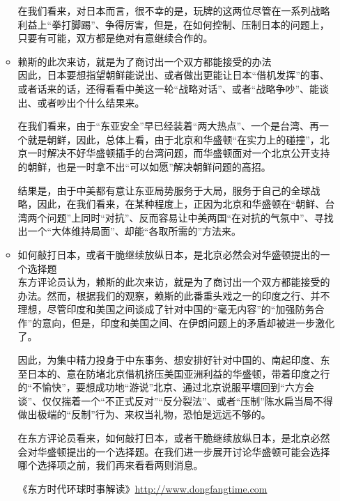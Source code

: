 \documentclass[a4paper,11pt]{article}
\begin{document}
\begin{itemize}
\begin{itemize}
    在我们看来，对日本而言，很不幸的是，玩牌的这两位尽管在一系列战略利益上“拳打脚踢”、争得厉害，但是，在如何控制、压制日本的问题上，只要有可能，双方都是绝对有意继续合作的。
 

\item 赖斯的此次来访，就是为了商讨出一个双方都能接受的办法\\
\label{sec-4_3_6}%
因此，日本要想指望朝鲜能说出、或者做出更能让日本“借机发挥”的事、或者话来的话，还得看看中美这一轮“战略对话”、或者“战略争吵”、能谈出、或者吵出个什么结果来。

   在我们看来，由于“东亚安全”早已经装着“两大热点”、一个是台湾、再一个就是朝鲜，因此，总体上看，由于北京和华盛顿“在实力上的碰撞”，北京一时解决不好华盛顿插手的台湾问题，而华盛顿面对一个北京公开支持的朝鲜，也是一时拿不出“可以如愿”解决朝鲜问题的高招。

    结果是，由于中美都有意让东亚局势服务于大局，服务于自己的全球战略，因此，在我们看来，在某种程度上，正因为北京和华盛顿在“朝鲜、台湾两个问题”上同时“对抗”、反而容易让中美两国“在对抗的气氛中”、寻找出一个“大体维持局面”、却能“各取所需的”方法来。
 

\item 如何敲打日本，或者干脆继续放纵日本，是北京必然会对华盛顿提出的一个选择题\\
\label{sec-4_3_7}%
东方评论员认为，赖斯的此次来访，就是为了商讨出一个双方都能接受的办法。然而，根据我们的观察，赖斯的此番重头戏之一的印度之行、并不理想，尽管印度和美国之间谈成了针对中国的“毫无内容”的“加强防务合作”的意向，但是，印度和美国之间、在伊朗问题上的矛盾却被进一步激化了。

   因此，为集中精力投身于中东事务、想安排好针对中国的、南起印度、东至日本的、意在防堵北京借机挤压美国亚洲利益的华盛顿，带着印度之行的“不愉快”，要想成功地“游说”北京、通过北京说服平壤回到“六方会谈”、仅仅揣着一个“不正式反对”“反分裂法”、或者“压制”陈水扁当局不得做出极端的“反制”行为、来权当礼物，恐怕是远远不够的。

   在东方评论员看来，如何敲打日本，或者干脆继续放纵日本，是北京必然会对华盛顿提出的一个选择题。在我们进一步展开讨论华盛顿可能会选择哪个选择项之前，我们再来看看两则消息。

   《东方时代环球时事解读》\href{http://www.dongfangtime.com}{http://www.dongfangtime.com}

   










\end{itemize} %
\end{itemize} %
\end{document}
